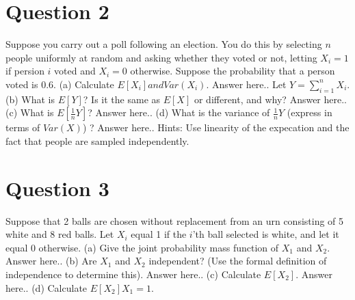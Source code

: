 \documentclass[12pt]{report}
\begin{document}
\section{Question 2}
Suppose you carry out a poll following an election. You do this by selecting $n$ people uniformly at random and asking whether they voted or not, letting $X_i = 1$ if persion $i$ voted and $X_i = 0$ otherwise. Suppose the probability that a person voted is $0.6$.
\newline
\newline
(a) Calculate $E[X_i] and Var(X_i)$.
\newline
Answer here..
\newline
\newline
Let $Y = \sum\limits_{i=1}^n X_i$.
\newline
(b) What is $E[Y]$? Is it the same as $E[X]$ or different, and why?
\newline
Answer here..
\newline
\newline
(c) What is $E[\frac{1}{n} Y]$?
\newline
Answer here..
\newline
\newline
(d) What is the variance of $\frac{1}{n} Y$ (express in terms of $Var(X)$) ?
\newline
Answer here..
\newline
\newline
Hints: Use linearity of the expecation and the fact that people are sampled independently.



\section{Question 3}
Suppose that 2 balls are chosen without replacement from an urn consisting of 5 white and 8 red balls. Let $X_i$ equal 1 if the $i$'th ball selected is white, and let it equal 0 otherwise. 
\newline
\newline
(a) Give the joint probability mass function of $X_1$ and $X_2$.
\newline
Answer here..
\newline
\newline
(b) Are $X_1$ and $X_2$ independent? (Use the formal definition of independence to determine this).
\newline
Answer here..
\newline
\newline
(c) Calculate $E[X_2]$.
\newline
Answer here..
\newline
\newline
(d) Calculate $E[X_2] X_1 = 1$.
\end{document}
